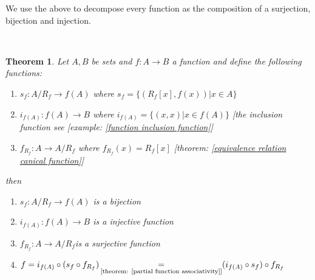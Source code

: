 \documentclass{book}
\newcommand{\equallim}{\mathop{=}\limits}
\newenvironment{enumeratealpha}{\begin{enumerate}[a{\textup{)}}] }{\end{enumerate}}
\newtheorem{theorem}{Theorem}
\begin{document}
We use the above to decompose every function as the composition of a
surjection, bijection and injection.

\

\begin{theorem}
  \label{equivalence relation canonical decomposition of a function}Let $A, B$
  be sets and $f : A \rightarrow B$ a function and define the following
  functions:
  \begin{enumeratealpha}
    \item $s_f : A / R_f \rightarrow f (A)$ where $s_f = \{ (R_f [x], f (x))
    |x \in A \}$
    
    \item $i_{f (A)} : f (A) \rightarrow B$ where $i_{f (A)} = \{ (x, x) |x
    \in f (A) \}$ [the inclusion function see [example: \ref{function
    inclusion function}]
    
    \item $f_{R_f} : A \rightarrow A / R_f$ where $f_{R_f} (x) = R_f [x]$
    [theorem: \ref{equivalence relation canical function}]
  \end{enumeratealpha}
  then
  \begin{enumerate}
    \item $s_f : A / R_f \rightarrow f (A)$ is a bijection
    
    \item $i_{f (A)} : f (A) \rightarrow B$ is a injective function
    
    \item $f_{R_f} : A \rightarrow A / R_f$\quad is a surjective function
    
    \item $f = i_{f (A)} \circ (s_f \circ f_{R_f}) \equallim_{\text{[theorem:
    \ref{partial function associativity}]}} (i_{f (A)} \circ s_f) \circ
    f_{R_f}$
  \end{enumerate}
\end{theorem}
\end{document}
